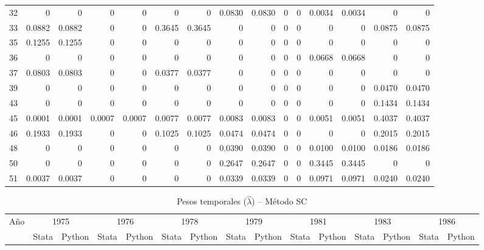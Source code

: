 \begin{table}[H]
\begin{tabular}{rrrrrrrrrrrrrrr}
32 & 0 & 0 & 0 & 0 & 0 & 0 & 0.0830 & 0.0830 & 0 & 0 & 0.0034 & 0.0034 & 0 & 0 \\
33 & 0.0882 & 0.0882 & 0 & 0 & 0.3645 & 0.3645 & 0 & 0 & 0 & 0 & 0 & 0 & 0.0875 & 0.0875 \\
35 & 0.1255 & 0.1255 & 0 & 0 & 0 & 0 & 0 & 0 & 0 & 0 & 0 & 0 & 0 & 0 \\
36 & 0 & 0 & 0 & 0 & 0 & 0 & 0 & 0 & 0 & 0 & 0.0668 & 0.0668 & 0 & 0 \\
37 & 0.0803 & 0.0803 & 0 & 0 & 0.0377 & 0.0377 & 0 & 0 & 0 & 0 & 0 & 0 & 0 & 0 \\
39 & 0 & 0 & 0 & 0 & 0 & 0 & 0 & 0 & 0 & 0 & 0 & 0 & 0.0470 & 0.0470 \\
43 & 0 & 0 & 0 & 0 & 0 & 0 & 0 & 0 & 0 & 0 & 0 & 0 & 0.1434 & 0.1434 \\
45 & 0.0001 & 0.0001 & 0.0007 & 0.0007 & 0.0077 & 0.0077 & 0.0083 & 0.0083 & 0 & 0 & 0.0051 & 0.0051 & 0.4037 & 0.4037 \\
46 & 0.1933 & 0.1933 & 0 & 0 & 0.1025 & 0.1025 & 0.0474 & 0.0474 & 0 & 0 & 0 & 0 & 0.2015 & 0.2015 \\
48 & 0 & 0 & 0 & 0 & 0 & 0 & 0.0390 & 0.0390 & 0 & 0 & 0.0100 & 0.0100 & 0.0186 & 0.0186 \\
50 & 0 & 0 & 0 & 0 & 0 & 0 & 0.2647 & 0.2647 & 0 & 0 & 0.3445 & 0.3445 & 0 & 0 \\
51 & 0.0037 & 0.0037 & 0 & 0 & 0 & 0 & 0.0339 & 0.0339 & 0 & 0 & 0.0971 & 0.0971 & 0.0240 & 0.0240 \\
\bottomrule
\end{tabular}
\end{table}

\begin{table}[H]
\centering
\caption{Pesos temporales ($\hat{\lambda}$) -- M\'etodo SC}
\label{tab:lambda_sc}
\footnotesize
\begin{tabular}{rrrrrrrrrrrrrrr}
\toprule
A\~no & \multicolumn{2}{c}{1975} & \multicolumn{2}{c}{1976} & \multicolumn{2}{c}{1978} & \multicolumn{2}{c}{1979} & \multicolumn{2}{c}{1981} & \multicolumn{2}{c}{1983} & \multicolumn{2}{c}{1986} \\
 & \scriptsize Stata & \scriptsize Python & \scriptsize Stata & \scriptsize Python & \scriptsize Stata & \scriptsize Python & \scriptsize Stata & \scriptsize Python & \scriptsize Stata & \scriptsize Python & \scriptsize Stata & \scriptsize Python & \scriptsize Stata & \scriptsize Python \\
\midrule
\bottomrule
\end{tabular}
\end{table}

